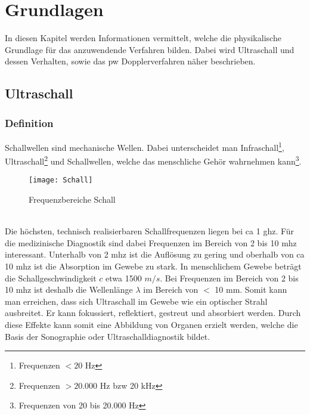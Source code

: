 \chapter{Grundlagen}
In diesen Kapitel werden Informationen vermittelt, welche die physikalische Grundlage für das anzuwendende Verfahren bilden. Dabei wird Ultraschall und dessen Verhalten, sowie das \acl{pw} Dopplerverfahren näher beschrieben.
\section{Ultraschall}
\subsection{Definition}
Schallwellen sind mechanische Wellen. Dabei unterscheidet man Infraschall\footnote{Frequenzen $< 20$ Hz}, Ultraschall\footnote{Frequenzen $>20.000$ Hz \ac{bzw} 20 kHz} und Schallwellen, welche das menschliche Gehör wahrnehmen kann\footnote{Frequenzen von 20 bis 20.000 Hz}.
\begin{figure}[h!]
		\centering
  		\texttt{[image: Schall]}  
  		\caption{Frequenzbereiche Schall}
  		\label{fig:Schall}
  	\end{figure}\\
Die höchsten, technisch realisierbaren Schallfrequenzen liegen bei \ac{ca} 1 \ac{ghz}. Für die medizinische Diagnostik sind dabei Frequenzen im Bereich von 2 bis 10 \ac{mhz} interessant. Unterhalb von 2 \ac{mhz} ist die Auflösung zu gering und oberhalb von \ac{ca} 10 \ac{mhz} ist die Absorption im Gewebe zu stark.\newline
In menschlichem Gewebe beträgt die Schallgeschwindigkeit $c$ etwa 1500 $m/s$. Bei Frequenzen im Bereich von 2 bis 10 \ac{mhz} ist deshalb die Wellenlänge $\lambda$ im Bereich von $<$ 10 mm. Somit kann man erreichen, dass sich Ultraschall im Gewebe wie ein optischer Strahl ausbreitet. Er kann fokussiert, reflektiert, gestreut und absorbiert werden. Durch diese Effekte kann somit eine Abbildung von Organen erzielt werden, welche die Basis der Sonographie oder Ultraschalldiagnostik bildet.%
\cite{suter2006}\cite{suter2009}\cite{suter2010}
%
